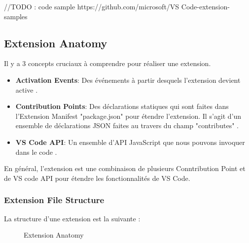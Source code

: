 \documentclass[
    iict, %
    il, %
]{heig-tb}
\begin{document}
//TODO : code sample https://github.com/microsoft/VS Code-extension-samples

\subsection{Extension Anatomy}
Il y a 3 concepts cruciaux à comprendre pour réaliser une extension.

\begin{itemize}
    \item \textbf{Activation Events}: Des événements à partir desquels l'extension devient active \cite{activation-events}.
    \item \textbf{Contribution Points}: Des déclarations statiques qui sont faites dans l'Extension Manifest "package.json" pour étendre l'extension. Il s'agit d'un ensemble de déclarations JSON faites au travers du champ "contributes" \cite{contribution-points}.
    \item \textbf{VS Code API}: Un ensemble d'API JavaScript que nous pouvons invoquer dans le code \cite{vs-code-api}.
\end{itemize}

En général, l'extension est une combinaison de plusieurs Conntribution Point et de VS code API pour étendre les fonctionnalités de VS Code.

\subsubsection{Extension File Structure}\label{Extension File Structure}


La structure d'une extension est la suivante :

\begin{figure}[!h]
    \begin{center}
    \end{center}
    \caption[Extension Anatomy]{\label{extension-anatomy} Extension Anatomy}
\end{figure}
\end{document}
